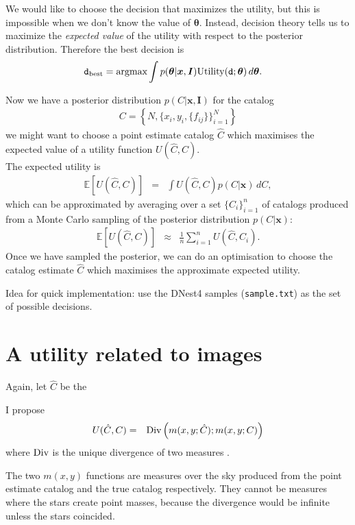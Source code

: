 \documentclass[a4paper,fleqn,usenatbib]{mnras}
\newcommand{\params}{\boldsymbol{\theta}}
\newcommand{\data}{\boldsymbol{x}}
\newcommand{\info}{\boldsymbol{I}}
\newcommand{\decision}{\texttt{d}}
\begin{document}
We would like to choose the decision that maximizes the utility, but this is
impossible when we don't know the value of $\params$. Instead, decision theory
tells us to maximize the {\em expected value} of the utility with respect
to the posterior distribution. Therefore the best decision is
\begin{align}
\decision_{\rm best} &= \textnormal{argmax}
\int p(\params | \data, \info)
        \textnormal{Utility}(\decision; \params) \, d\params.
\end{align}

Now we have a posterior distribution $p(C|\data, \info)$ for the catalog
\begin{eqnarray}
C = \left\{N,\{x_i, y_i, \{f_{ij}\}\}_{i=1}^N \right\}
\end{eqnarray}
we might want to choose a point estimate catalog $\hat{C}$ which
maximises the expected value of a utility function $U(\hat{C}, C)$.\\

The expected utility is
\begin{eqnarray}
\mathds{E}\left[U(\hat{C}, C)\right]
&=&
\int U(\hat{C}, C) p(C | \data) \, dC,
\end{eqnarray}
which can be approximated by averaging over a set $\{C_i\}_{i=1}^n$
of catalogs produced from a Monte Carlo sampling of the posterior distribution
$p(C|\data)$:
\begin{eqnarray}
\mathds{E}\left[U(\hat{C}, C)\right]
&\approx&
\frac{1}{n} \sum_{i=1}^n U(\hat{C}, C_i).
\end{eqnarray}
Once we have sampled the posterior, we can do an optimisation to choose the
catalog estimate $\hat{C}$ which maximises the approximate expected utility.

Idea for quick implementation: use the DNest4 samples ({\tt sample.txt})
as the set of possible decisions.

\section{A utility related to images}
Again, let $\hat{C}$ be the 

I propose
\begin{eqnarray}
U(\hat{C}, C) &=& \textnormal{Div}\left(m(x, y; \hat{C}); m(x, y; C)\right)
\end{eqnarray}
where $\textnormal{Div}$ is the unique divergence of
two measures \citep{knuth2012foundations}.

The two $m(x, y)$ functions are measures over the sky produced from the
point estimate catalog and the true catalog respectively. They cannot be
measures where the stars create point masses, because the divergence would
be infinite unless the stars coincided.
\end{document}
